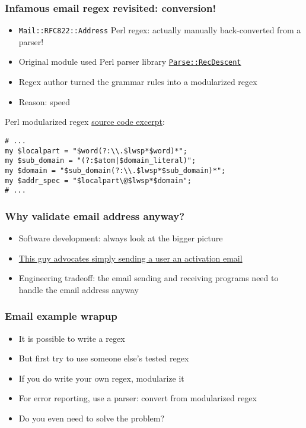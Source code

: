 \begin{frame}[fragile]
  \frametitle{Infamous email regex revisited: conversion!}

  \begin{itemize}
    \item \texttt{Mail::RFC822::Address} Perl regex: actually manually back-converted from a parser!
    \item Original module used Perl parser library \href{http://search.cpan.org/~jtbraun/Parse-RecDescent-1.967009/lib/Parse/RecDescent.pm}{\texttt{Parse::RecDescent}}
    \item Regex author turned the grammar rules into a modularized regex
    \item Reason: speed
  \end{itemize}

  Perl modularized regex \href{http://cpansearch.perl.org/src/PDWARREN/Mail-RFC822-Address-0.3/Address.pm}{source code excerpt}:
  \begin{verbatim}
# ...
my $localpart = "$word(?:\\.$lwsp*$word)*";
my $sub_domain = "(?:$atom|$domain_literal)";
my $domain = "$sub_domain(?:\\.$lwsp*$sub_domain)*";
my $addr_spec = "$localpart\@$lwsp*$domain";
# ...
  \end{verbatim}
\end{frame}

%

\begin{frame}
  \frametitle{Why validate email address anyway?}

  \begin{itemize}
    \item Software development: always look at the bigger picture 
    \item \href{http://davidcel.is/blog/2012/09/06/stop-validating-email-addresses-with-regex/}{This guy advocates simply sending a user an activation email}
    \item Engineering tradeoff: the email sending and receiving programs need to handle the email address anyway
  \end{itemize}
\end{frame}

\begin{frame}
  \frametitle{Email example wrapup}

  \begin{itemize}
    \item It is possible to write a regex
    \item But first try to use someone else's tested regex
    \item If you do write your own regex, modularize it
    \item For error reporting, use a parser: convert from modularized regex
    \item Do you even need to solve the problem?
  \end{itemize}
\end{frame}

